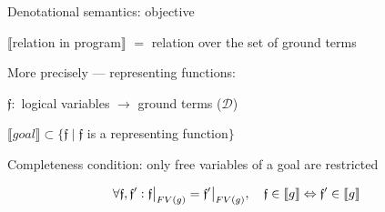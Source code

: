 \documentclass{beamer}
\newcommand{\sembr}[1]{\llbracket{#1}\rrbracket}
\theoremstyle{definition}
\theoremstyle{plain} %
\begin{document}
\begin{frame}{Denotational semantics: objective}

\begin{center}
$\llbracket$relation in program$\rrbracket$ $=$ relation over the set of ground terms
\end{center}

\vskip5mm

More precisely --- representing functions:

\begin{center}


${\mathfrak f} \colon$ logical variables $\to$ ground terms ($\mathcal{D}$)

\vskip3mm

$\sembr{goal} \subset \{ {\mathfrak f} \mid {\mathfrak f}$ is a representing function$\}$

\end{center}

\vskip5mm

Completeness condition: only free variables of a goal are restricted

\[\forall {\mathfrak f}, {\mathfrak f'}:  {\mathfrak f}\big{|}_{FV(g)} = {\mathfrak f'}\big{|}_{FV(g)}, \quad {\mathfrak f} \in \sembr{g} \Leftrightarrow {\mathfrak f'} \in \sembr{g}\]




\end{frame}
\end{document}
